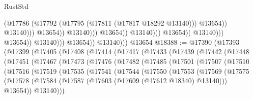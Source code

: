 \begin{lexlean}{RustStd}
\begin{coremodule}
                                                            (@17786
                                                              (@17792
                                                                (@17795
                                                                  (@17811 (@17817 @18292 @13140)))
                                                                @13654))
                                                            @13140)))
                                                      @13654))
                                                  @13140)))
                                            @13654))
                                        @13140)))
                                  @13654))
                              @13140)))
                        @13654))
                    @13140)))
              @13654))
          @13140)))
    @13654
@18388 := @17390
    (@17393
      (@17399
        (@17405
          (@17408
            (@17414
              (@17417
                (@17433
                  (@17439
                    (@17442
                      (@17448
                        (@17451
                          (@17467
                            (@17473
                              (@17476
                                (@17482
                                  (@17485
                                    (@17501
                                      (@17507
                                        (@17510
                                          (@17516
                                            (@17519
                                              (@17535
                                                (@17541
                                                  (@17544
                                                    (@17550
                                                      (@17553
                                                        (@17569
                                                          (@17575
                                                            (@17578
                                                              (@17584
                                                                (@17587
                                                                  (@17603
                                                                    (@17609
                                                                      (@17612 @18340)
                                                                      @13140)))
                                                                @13654))
                                                            @13140)))

\end{coremodule}
\end{lexlean}
